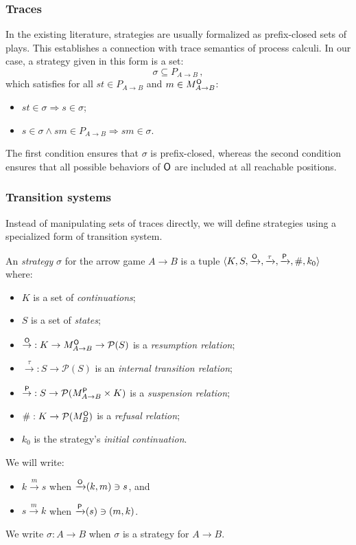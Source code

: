 \subsubsection{Traces}

In the existing literature,
strategies are usually formalized as prefix-closed sets of plays.
This establishes a connection with trace semantics of process calculi.
In our case,
a strategy given in this form is a set:
\[ \sigma \subseteq P_{A \rightarrow B} \,, \]
which satisfies
for all $st \in P_{A \rightarrow B}$
and $m \in M_{A \rightarrow B}^{ \mathsf{O} }$:
\begin{itemize}
  \item $st \in \sigma \Rightarrow s \in \sigma$;
  \item $s \in \sigma \wedge sm \in P_{A \rightarrow B}
    \Rightarrow sm \in \sigma$.
\end{itemize}
The first condition ensures that $\sigma$ is prefix-closed,
whereas the second condition ensures that
all possible behaviors of $ \mathsf{O} $ are included
at all reachable positions.

\subsubsection{Transition systems}

Instead of manipulating sets of traces directly,
we will define strategies using a specialized form of transition system.

\begin{definition}
An \emph{strategy} $\sigma$ for the arrow game $A \rightarrow B$
is a tuple
$\langle K, S,
{\xrightarrow{ \mathsf{O} }},
{\xrightarrow{\tau}},
{\xrightarrow{ \mathsf{P} }},
 \#, k_0 \rangle$
where:
\begin{itemize}
  \item $K$ is a set of \emph{continuations};
  \item $S$ is a set of \emph{states};
  \item ${\stackrel{ \mathsf{O} }{\rightarrow}} :
         K \rightarrow M_{A \rightarrow B}^{ \mathsf{O} } \rightarrow \mathcal{P}(S)$
    is a \emph{resumption relation};
  \item ${\stackrel{\tau}{\rightarrow}} : S \rightarrow \mathcal{P}(S)$
    is an \emph{internal transition relation};
  \item ${\stackrel{ \mathsf{P} }{\rightarrow}} :
         S \rightarrow \mathcal{P}(M_{A \rightarrow B}^{ \mathsf{P} } \times K)$
    is a \emph{suspension relation};
  \item ${\#} : K \rightarrow \mathcal{P}(M_B^{ \mathsf{O} })$
    is a \emph{refusal relation};
  \item $k_0$
    is the strategy's \emph{initial continuation}.
\end{itemize}
We will write:
\begin{itemize}
  \item $k \xrightarrow{m} s$ when ${\xrightarrow{ \mathsf{O} }}(k, m) \ni s$, and
  \item $s \xrightarrow{m} k$ when ${\xrightarrow{ \mathsf{P} }}(s) \ni (m, k)$.
\end{itemize}
We write $\sigma : A \rightarrow B$ when $\sigma$ is a strategy
for $A \rightarrow B$.
\end{definition}

